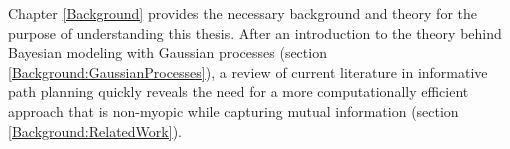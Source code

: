 %		
%		

		Chapter \ref{Background} provides the necessary background and theory for the purpose of understanding this thesis. After an introduction to the theory behind Bayesian modeling with Gaussian processes (section \ref{Background:GaussianProcesses}), a review of current literature in informative path planning quickly reveals the need for a more computationally efficient approach that is non-myopic while capturing mutual information (section \ref{Background:RelatedWork}).
		
